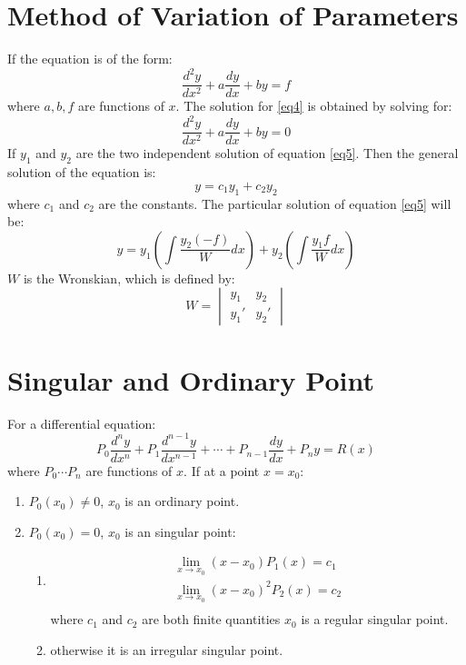 \documentclass[openany, oneside]{book}
\begin{document}
\section{Method of Variation of Parameters}
If the equation is of the form:
\begin{equation}
\dfrac{d^2y}{dx^2}+a\dfrac{dy}{dx}+by=f\label{eq4}
\end{equation}
where $a,b,f$ are functions of $x$. The solution for \ref{eq4} is obtained by solving for:
\begin{equation}\label{eq5}
\dfrac{d^2y}{dx^2}+a\dfrac{dy}{dx}+by=0
\end{equation}
If $y_1$ and $y_2$ are the two independent solution of equation \ref{eq5}.\newline
Then the general solution of the equation is:
\begin{equation}
y=c_1y_1+c_2y_2
\end{equation}
where $c_1$ and $c_2$ are the constants.\newline
The particular solution of equation \ref{eq5} will be:
\begin{equation}
y=y_1 \left(\int \dfrac{y_2(-f)}{W}dx\right)+y_2\left(\int \dfrac{y_1 f}{W}dx\right)
\end{equation}
$W$ is the Wronskian, which is defined by:
\begin{equation}
W=\begin{vmatrix}
y_1&y_2\\
y_1'&y_2'
\end{vmatrix}
\end{equation}

\section{Singular and Ordinary Point}
For a differential equation:
\begin{equation}
P_0 \dfrac{d^n y}{dx^n}+P_1 \dfrac{d^{n-1}y}{dx^{n-1}}+\cdots+P_{n-1} \dfrac{dy}{dx}+P_n y=R(x)
\end{equation}
where $P_0 \cdots P_n$ are functions of $x$.\newline
If at a point $x=x_0$:
\begin{enumerate}
\item $P_0(x_0) \neq 0$, $x_0$ is an ordinary point.
\item $P_0(x_0)=0$, $x_0$ is an singular point: \begin{enumerate}
\item \begin{align}
\lim_{x\to x_0}(x-x_0)P_1(x)=c_1\\
\lim_{x\to x_0}(x-x_0)^2P_2(x)=c_2\\
\end{align}
where $c_1$ and $c_2$ are both finite quantities $x_0$ is a regular singular point.
\item otherwise it is an irregular singular point.
\end{enumerate}
\end{enumerate}
\end{document}
